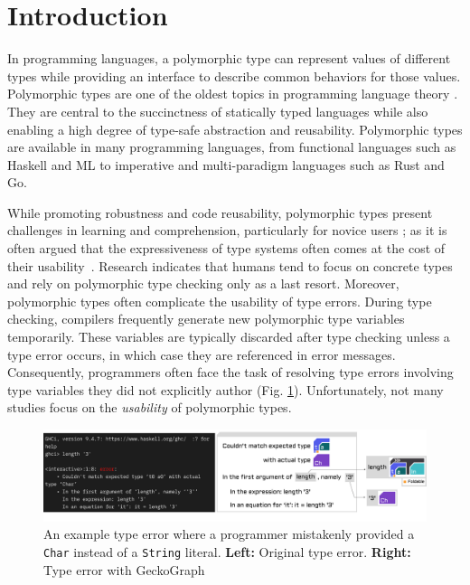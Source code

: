 \documentclass[preprint,12pt]{elsarticle}
\begin{document}
\section{Introduction} \label{sec:intro}
In programming languages, a polymorphic type \cite{Cardelli1987-fp} can represent values of different types while providing an interface to describe common behaviors for those values. Polymorphic types are one of the oldest topics in programming language theory \cite{Cardelli1987-fp}. They are central to the succinctness of statically typed languages while also enabling a high degree of type-safe abstraction and reusability. Polymorphic types are available in many programming languages, from functional languages such as Haskell and ML to imperative and multi-paradigm languages such as Rust\cite{Klabnik_undated-wx} and Go\cite{Griesemer_undated-ff}.


While promoting robustness and code reusability, polymorphic types present challenges in learning and comprehension, particularly for novice users \cite{Jun2000-ec, Jun2000-yu}; as it is often argued that the expressiveness of type systems often comes at the cost of their usability~\cite{Hage2020-hg}. Research indicates that humans tend to focus on concrete types and rely on polymorphic type checking only as a last resort. Moreover, polymorphic types often complicate the usability of type errors. During type checking, compilers frequently generate new polymorphic type variables temporarily. These variables are typically discarded after type checking unless a type error occurs, in which case they are referenced in error messages. Consequently, programmers often face the task of resolving type errors involving type variables they did not explicitly author (Fig. \ref{fig:example-foldable}). Unfortunately, not many studies focus on the \textit{usability} of polymorphic types. 

\begin{figure}[]
  \includegraphics[width=\linewidth]{figures/Foldable}
  \caption{\label{fig:example-foldable} An example type error where a programmer mistakenly provided a \texttt{Char} instead of a \texttt{String} literal. {\bf Left:} Original type error. {\bf Right:} Type error with GeckoGraph}
\end{figure}
\end{document}
